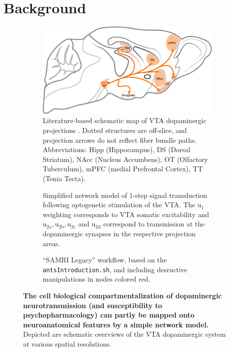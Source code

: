 \section{Background}

\begin{figure}[h!]
	\begin{subfigure}{.53\textwidth}
		\centering
		\includegraphics[width=\textwidth]{img/model_literature}
		\caption{
			Literature-based schematic map of VTA dopaminergic projections \cite{Aransay2015,Fields2007,Ikemoto2007,Hnasko2012,Pan2010}.
			Dotted structures are off-slice, and projection arrows do not reflect fiber bundle paths.
			Abbreviations: Hipp (Hippocampus), DS (Dorsal Striatum), NAcc (Nucleus Accumbens), OT (Olfactory Tuberculum), mPFC (medial Prefrontal Cortex), TT (Tenia Tecta).
			}
		\label{fig:ml}
	\end{subfigure}
	\begin{subfigure}{.45\textwidth}
		\centering
		\vspace{-1em}
		\vspace{-1em}
		\caption{
			Simplified network model of 1-step signal transduction following optogenetic stimulation of the VTA.
			The $\mathrm{u_1}$ weighting corresponds to VTA somatic excitability and $\mathrm{u_{2a},u_{2b},u_{2c}}$ and $\mathrm{u_{2d}}$ correspond to transmission at the dopaminergic synapses in the respective projection areas.
			}
		\label{fig:md}
	\end{subfigure}
	\begin{subfigure}{.96\textwidth}
		\centering
		\caption{
			“SAMRI Legacy” workflow, based on the \textcolor{mg}{\texttt{antsIntroduction.sh}}, and including desructive manipulations in nodes colored red.
			}
		\label{fig:nm}
	\end{subfigure}
	\caption{
		\textbf{The cell biological compartmentalization of dopaminergic neurotransmission (and susceptibility to psychopharmacology) can partly be mapped onto neuroanatomical features by a simple network model.}
		Depicted are schematic overviews of the VTA dopaminergic system at various spatial resolutions.
		}
	\label{fig:m}
\end{figure}

